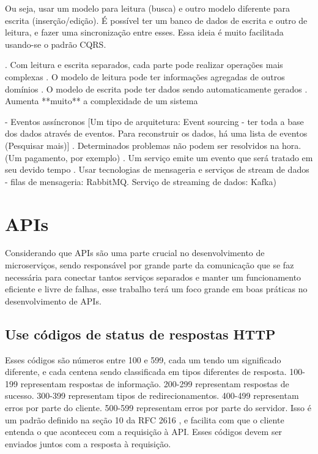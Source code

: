            Ou seja, usar um modelo para leitura (busca) e outro modelo diferente para escrita (inserção/edição). É possível ter um banco de dados de escrita e outro de leitura, e fazer uma sincronização entre esses. Essa ideia é muito facilitada usando-se o padrão CQRS.
           
           . Com leitura e escrita separados, cada parte pode realizar operações mais complexas
           . O modelo de leitura pode ter informações agregadas de outros domínios
           . O modelo de escrita pode ter dados sendo automaticamente gerados
           . Aumenta **muito** a complexidade de um sistema

        - Eventos assíncronos
            [Um tipo de arquitetura: Event sourcing - ter toda a base dos dados através de eventos. Para reconstruir os dados, há uma lista de eventos (Pesquisar mais)]
            . Determinados problemas não podem ser resolvidos na hora. (Um pagamento, por exemplo)
            . Um serviço emite um evento que será tratado em seu devido tempo
            . Usar tecnologias de mensageria e serviços de stream de dados - filas de mensageria: RabbitMQ. Serviço de streaming de dados: Kafka)

\section{APIs}

Considerando que APIs são uma parte crucial no desenvolvimento de microserviços, sendo responsável por grande parte da comunicação que se faz necessária para conectar tantos serviços separados e manter um funcionamento eficiente e livre de falhas, esse trabalho terá um foco grande em boas práticas no desenvolvimento de APIs.

\subsection{Use códigos de status de respostas HTTP}
Esses códigos são números entre 100 e 599, cada um tendo um significado diferente, e cada centena sendo classificada em tipos diferentes de resposta. 100-199 representam respostas de informação. 200-299 representam respostas de sucesso. 300-399 representam tipos de redirecionamentos. 400-499 representam erros por parte do cliente. 500-599 representam erros por parte do servidor. Isso é um padrão definido na seção 10 da RFC 2616 \cite{rfc_http_nielsen_1999}, e facilita com que o cliente entenda o que aconteceu com a requisição à API. Esses códigos devem ser enviados juntos com a resposta à requisição.

